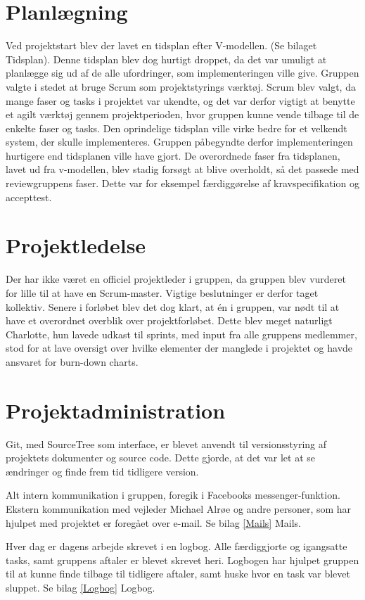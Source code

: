 \section{Planlægning}
Ved projektstart blev der lavet en tidsplan efter V-modellen. (Se bilaget Tidsplan). Denne tidsplan blev dog hurtigt droppet, da det var umuligt at planlægge sig ud af de alle ufordringer, som implementeringen ville give. Gruppen valgte i stedet at bruge Scrum som projektstyrings værktøj. Scrum blev valgt, da mange faser og tasks i projektet var ukendte, og det var derfor vigtigt at benytte et agilt værktøj gennem projektperioden, hvor gruppen kunne vende tilbage til de enkelte faser og tasks. Den oprindelige tidsplan ville virke bedre for et velkendt system, der skulle implementeres. Gruppen påbegyndte derfor implementeringen hurtigere end tidsplanen ville have gjort. De overordnede faser fra tidsplanen, lavet ud fra v-modellen, blev stadig forsøgt at blive overholdt, så det passede med  reviewgruppens faser. Dette var for eksempel færdiggørelse af kravspecifikation og accepttest. 

\section{Projektledelse}
Der har ikke været en officiel projektleder i gruppen, da gruppen blev vurderet for lille til at have en Scrum-master. Vigtige beslutninger er derfor taget kollektiv. Senere i forløbet blev det dog klart, at én i gruppen, var nødt til at have et overordnet overblik over projektforløbet. Dette blev meget naturligt Charlotte, hun lavede udkast til sprints, med input fra alle gruppens medlemmer, stod for at lave oversigt over hvilke elementer der manglede i projektet og havde ansvaret for burn-down charts. 

\section{Projektadministration}
Git, med SourceTree som interface, er blevet anvendt til versionsstyring af projektets dokumenter og source code. Dette gjorde, at det var let at se ændringer og finde frem tid tidligere version. 

Alt intern kommunikation i gruppen, foregik i Facebooks messenger-funktion. Ekstern kommunikation med vejleder Michael Alrøe og andre personer, som har hjulpet med projektet er foregået over e-mail. Se bilag \ref{Mails} Mails.  

Hver dag er dagens arbejde skrevet i en logbog. Alle færdiggjorte og igangsatte tasks, samt gruppens aftaler er blevet skrevet heri. Logbogen har hjulpet gruppen til at kunne finde tilbage til tidligere aftaler, samt huske hvor en task var blevet sluppet. Se bilag \ref{Logbog} Logbog.  

